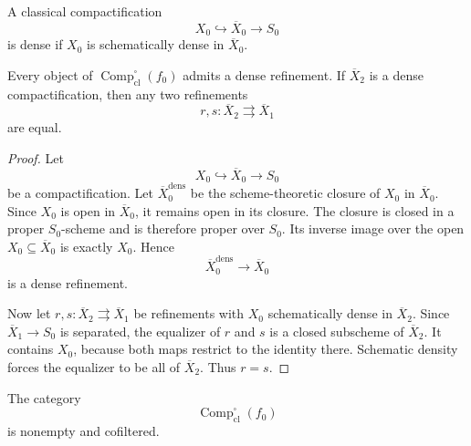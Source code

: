 \begin{definition}
\label{def:dense-classical-compactification}
A classical compactification
\[
    X_0\hookrightarrow\overline X_0\longrightarrow S_0
\]
is dense if \(X_0\) is schematically dense in \(\overline X_0\).
\end{definition}

\begin{lemma}
\label{lem:dense-compactification-uniqueness}
Every object of
\(\operatorname{Comp}^{\square}_{\mathrm{cl}}(f_0)\) admits a dense
refinement.  If \(\overline X_2\) is a dense compactification, then any two
refinements
\[
    r,s:\overline X_2\rightrightarrows\overline X_1
\]
are equal.
\end{lemma}

\begin{proof}
Let
\[
    X_0\hookrightarrow\overline X_0\longrightarrow S_0
\]
be a compactification.  Let \(\overline X_0^{\mathrm{dens}}\) be the
scheme-theoretic closure of \(X_0\) in \(\overline X_0\).  Since \(X_0\)
is open in \(\overline X_0\), it remains open in its closure.  The closure
is closed in a proper \(S_0\)-scheme and is therefore proper over \(S_0\).
Its inverse image over the open \(X_0\subseteq\overline X_0\) is exactly
\(X_0\).  Hence
\[
    \overline X_0^{\mathrm{dens}}
    \longrightarrow
    \overline X_0
\]
is a dense refinement.

Now let \(r,s:\overline X_2\rightrightarrows\overline X_1\) be refinements
with \(X_0\) schematically dense in \(\overline X_2\).  Since
\(\overline X_1\to S_0\) is separated, the equalizer of \(r\) and \(s\)
is a closed subscheme of \(\overline X_2\).  It contains \(X_0\), because
both maps restrict to the identity there.  Schematic density forces the
equalizer to be all of \(\overline X_2\).  Thus \(r=s\).
\end{proof}

\begin{proposition}
\label{prop:classical-strict-compactifications-cofiltered}
The category
\[
    \operatorname{Comp}^{\square}_{\mathrm{cl}}(f_0)
\]
is nonempty and cofiltered.
\end{proposition}

